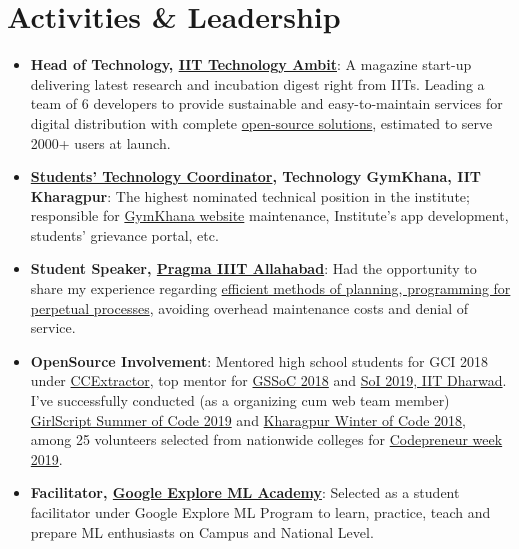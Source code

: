 \documentclass[a4paper,10pt]{extarticle} %
\begin{document}
\section{\textcolor{primary}{Activities \& Leadership}}

\begin{itemize}[leftmargin=0.55cm, rightmargin=0.2cm, label={\Large\textbullet}]

\item\textbf{Head of Technology, {\href{https://iit-techambit.in}{IIT Technology Ambit}}}: A magazine start-up delivering latest research and incubation digest right from IITs. Leading a team of 6 developers to provide sustainable and easy-to-maintain services for digital distribution with complete {\href{https://github.com/iit-technology-ambit/}{open-source solutions}}, estimated to serve 2000+ users at launch.

\item \textbf{\href{https://wiki.metakgp.org/w/Constitution_of_the_Technology_Students\%27_Gymkhana#1._TECHNOLOGY_COORDINATOR:}{Students' Technology Coordinator}, Technology GymKhana, IIT Kharagpur}: The highest nominated technical position in the institute; responsible for \href{http://gymkhana.iitkgp.ac.in/index.php}{GymKhana website} maintenance, Institute's app development, students' grievance portal, etc.

\item \textbf{Student Speaker, \href{http://pragmaconf.tech}{Pragma IIIT Allahabad}}: Had the opportunity to share my experience regarding \href{https://prezi.com/view/tf50MBbGtm9FgPKQfieI/}{efficient methods of planning, programming for perpetual processes}, avoiding overhead maintenance costs and denial of service.

\item \textbf{OpenSource Involvement}: Mentored high school students for GCI 2018 under \href{https://codein.withgoogle.com/organizations/ccextractor-development/}{CCExtractor}, top mentor for \href{https://www.gssoc.tech/}{GSSoC 2018} and \href{https://oss2019.github.io/SoI.html}{SoI 2019, IIT Dharwad}. I've successfully conducted (as a organizing cum web team member) \href{https://gssoc.tech/}{GirlScript Summer of Code 2019} and \href{https://kwoc.kossiitkgp.org/}{Kharagpur Winter of Code 2018}, among 25 volunteers selected from nationwide colleges for \href{http://codepreneur.in}{Codepreneur week 2019}.

\item \textbf{Facilitator, \href{https://events.withgoogle.com/explore-ml-in/}{Google Explore ML Academy}}: Selected as a student facilitator under Google Explore ML Program to learn, practice, teach and prepare ML enthusiasts on Campus and National Level.


\end{itemize}
\end{document}
